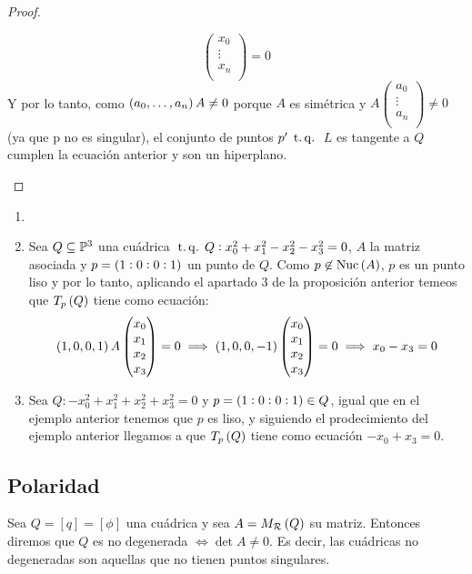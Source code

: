 \begin{proof}
\begin{enumerate}[(1)]
\[   \begin{pmatrix}
    x_0\\ \vdots\\ x_n\\
   \end{pmatrix}=0
  \]
  Y por lo tanto, como $\left( a_0,\dots,a_n\right) A \neq 0$ porque $A$ es simétrica y $A\begin{pmatrix}
  a_0\\ \vdots\\ a_n\\ \end{pmatrix} \neq 0$ (ya que p no es singular), el conjunto de puntos $p' \operatorname{\;t.q.\;}$
  $L$ es tangente a $Q$ cumplen la ecuación anterior y son un hiperplano.
 \end{enumerate}
\end{proof}

\begin{example}
 \begin{enumerate}
  \item []
  \item Sea $Q\subseteq\mathbb{P}^3$ una cuádrica $\operatorname{\;t.q.\;} Q:x^2_0 +x^2_1 -x^2_2 -x^2_3=0$, $A$ la matriz asociada y $p=\left( 1:0:0:1\right)$
  un punto de $Q$. Como $p\not\in \operatorname{Nuc} \left( A\right)$, $p$ es un punto liso y por lo tanto, aplicando el 
  apartado $3$ de la proposición anterior temeos que $T_p\left( Q \right)$ tiene como ecuación:
  \[
   \left( 1,0,0,1 \right) A \begin{pmatrix}x_0\\x_1\\x_2\\x_3\\ \end{pmatrix} = 0 \implies 
   \left( 1,0,0,-1 \right) \begin{pmatrix}x_0\\x_1\\x_2\\x_3\\ \end{pmatrix} = 0 \implies
   x_0-x_3=0
  \]
  \item Sea $Q:-x^2_0 +x^2_1 +x^2_2 +x^2_3=0$ y $p=\left( 1:0:0:1\right) \in Q$, igual que en el
  ejemplo anterior tenemos que $p$ es liso, y siguiendo el prodecimiento del ejemplo anterior llegamos 
  a que $T_p\left( Q \right)$ tiene como ecuación $-x_0 +x_3=0$.
 \end{enumerate}
\end{example}

\subsection{Polaridad}
\begin{defi}
  Sea $Q=[q]=[\phi]$ una cuádrica y sea $A=M_{\mathcal{R}}\left( Q\right)$ su matriz. Entonces diremos que $Q$ es no
  degenerada $\iff \det A \neq 0$. Es decir, las cuádricas no degeneradas son aquellas que no tienen
  puntos singulares.
\end{defi}

